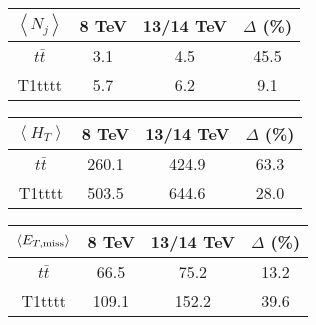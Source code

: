 \begin{tabular}{c | ccc}
 \hline\hline
$\left<N_j \right>$ & 8 TeV & 13/14 TeV & $\Delta$ (\%) \\
\hline
 $t\bar{t}$ & 3.1 & 4.5 & 45.5\\
T1tttt & 5.7 & 6.2 & 9.1\\ \hline\hline
\end{tabular}

\begin{tabular}{c | ccc}
 \hline\hline
$\left<H_T \right>$ & 8 TeV & 13/14 TeV & $\Delta$ (\%) \\
\hline
 $t\bar{t}$ & 260.1 & 424.9 & 63.3\\
T1tttt & 503.5 & 644.6 & 28.0\\ \hline\hline
\end{tabular}

\begin{tabular}{c | ccc}
 \hline\hline
$\left<E_{T, {\rm miss}} \right>$ & 8 TeV & 13/14 TeV & $\Delta$ (\%) \\
\hline
 $t\bar{t}$ & 66.5 & 75.2 & 13.2\\
T1tttt & 109.1 & 152.2 & 39.6\\ \hline\hline
\end{tabular}

